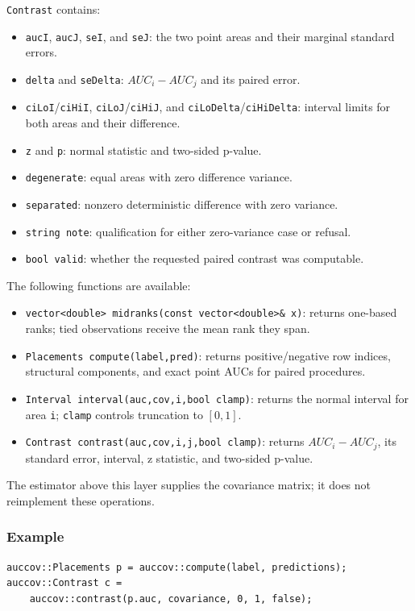 \texttt{Contrast} contains:

\begin{itemize}
\item \texttt{aucI}, \texttt{aucJ}, \texttt{seI}, and \texttt{seJ}: the two
      point areas and their marginal standard errors.
\item \texttt{delta} and \texttt{seDelta}: $AUC_i-AUC_j$ and its paired error.
\item \texttt{ciLoI}/\texttt{ciHiI}, \texttt{ciLoJ}/\texttt{ciHiJ}, and
      \texttt{ciLoDelta}/\texttt{ciHiDelta}: interval limits for both areas and
      their difference.
\item \texttt{z} and \texttt{p}: normal statistic and two-sided p-value.
\item \texttt{degenerate}: equal areas with zero difference variance.
\item \texttt{separated}: nonzero deterministic difference with zero variance.
\item \texttt{string note}: qualification for either zero-variance case or refusal.
\item \texttt{bool valid}: whether the requested paired contrast was computable.
\end{itemize}

The following functions are available:

\begin{itemize}
\item \texttt{vector<double> midranks(const vector<double>\& x)}: returns
      one-based ranks; tied observations receive the mean rank they span.
\item \texttt{Placements compute(label,pred)}: returns positive/negative row
      indices, structural components, and exact point AUCs for paired procedures.
\item \texttt{Interval interval(auc,cov,i,bool clamp)}: returns the normal
      interval for area \texttt{i}; \texttt{clamp} controls truncation to
      $[0,1]$.
\item \texttt{Contrast contrast(auc,cov,i,j,bool clamp)}: returns
      $AUC_i-AUC_j$, its standard error, interval, z statistic, and two-sided
      p-value.
\end{itemize}

The estimator above this layer supplies the covariance matrix; it does not
reimplement these operations.

\subsubsection{Example}
\begin{verbatim}
auccov::Placements p = auccov::compute(label, predictions);
auccov::Contrast c =
    auccov::contrast(p.auc, covariance, 0, 1, false);
\end{verbatim}

